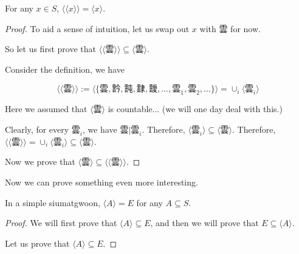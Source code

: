 \begin{theorem}\label{thm:indempotence-of-emergence}
    For any $x\in S$, $\langle \langle x \rangle \rangle = \langle x \rangle$.
\end{theorem}
\begin{proof}
    To aid a sense of intuition, let us swap out $x$ with $\text{雲}$ for now. 

    So let us first prove that $\langle \langle \text{雲} \rangle \rangle \subseteq \langle \text{雲} \rangle$.

    Consider the definition, we have
    
    $$\langle \langle \text{雲} \rangle \rangle := \langle \{\text{雲}, \text{霒}, \text{霕}, \text{霴}, \text{靉}, \ldots, \text{雲}_{1}, \text{雲}_{2}, \ldots\} \rangle = \cup_{i} \langle \text{雲}_{i} \rangle$$ 

    Here we assumed that $\langle \text{雲} \rangle$ is countable... (we will one day deal with this.)

    Clearly, for every $\text{雲}_{i}$, we have $\text{雲}|\text{雲}_{i}$. Therefore, $\langle \text{雲}_{i} \rangle \subseteq \langle \text{雲} \rangle$. Therefore, $\langle \langle \text{雲} \rangle \rangle =
        \cup_{i} \langle \text{雲}_{i} \rangle \subseteq \langle \text{雲} \rangle$.







    Now we prove that $\langle \text{雲} \rangle \subseteq \langle \langle \text{雲} \rangle \rangle$.


    
\end{proof}



Now we can prove something even more interesting. 
\begin{theorem}\label{thm:hais-of-sets-are-siumatgwoons}
    In a simple siumatgwoon, $\langle A \rangle = E$ for any $A\subseteq S$.
\end{theorem}
\begin{proof}
    We will first prove that $\langle A \rangle \subseteq E$, and then we will prove that $E \subseteq \langle A \rangle$.

    Let us prove that $\langle A \rangle \subseteq E$.  


 
\end{proof}
